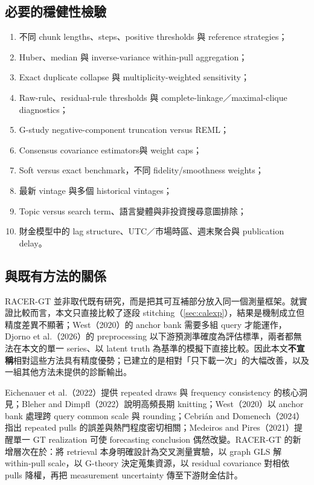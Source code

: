 \documentclass[12pt,a4paper,oneside]{article}
\begin{document}
\subsection{必要的穩健性檢驗}

\begin{enumerate}
  \item 不同 chunk lengths、steps、positive thresholds 與 reference strategies；
  \item Huber、median 與 inverse-variance within-pull aggregation；
  \item Exact duplicate collapse 與 multiplicity-weighted sensitivity；
  \item Raw-rule、residual-rule thresholds 與 complete-linkage／maximal-clique diagnostics；
  \item G-study negative-component truncation versus REML；
  \item Consensus covariance estimators與 weight caps；
  \item Soft versus exact benchmark，不同 fidelity/smoothness weights；
  \item 最新 vintage 與多個 historical vintages；
  \item Topic versus search term、語言變體與非投資搜尋意圖排除；
  \item 財金模型中的 lag structure、UTC／市場時區、週末聚合與 publication delay。
\end{enumerate}

\subsection{與既有方法的關係}

RACER-GT 並非取代既有研究，而是把其可互補部分放入同一個測量框架。就實證比較而言，本文只直接比較了逐段 stitching（\cref{sec:calexp}），結果是機制成立但精度差異不顯著；West（2020）的 anchor bank 需要多組 query 才能運作，Djorno et al.（2026）的 preprocessing 以下游預測準確度為評估標準，兩者都無法在本文的單一 series、以 latent truth 為基準的模擬下直接比較。因此本文\textbf{不宣稱}相對這些方法具有精度優勢；已建立的是相對「只下載一次」的大幅改善，以及一組其他方法未提供的診斷輸出。

Eichenauer et al.（2022）提供 repeated draws 與 frequency consistency 的核心洞見；Bleher and Dimpfl（2022）說明高頻長期 knitting；West（2020）以 anchor bank 處理跨 query common scale 與 rounding；Cebrián and Domenech（2024）指出 repeated pulls 的誤差與熱門程度密切相關；Medeiros and Pires（2021）提醒單一 GT realization 可使 forecasting conclusion 偶然改變。RACER-GT 的新增層次在於：將 retrieval 本身明確設計為交叉測量實驗，以 graph GLS 解 within-pull scale，以 G-theory 決定蒐集資源，以 residual covariance 對相依 pulls 降權，再把 measurement uncertainty 傳至下游財金估計。
\end{document}
